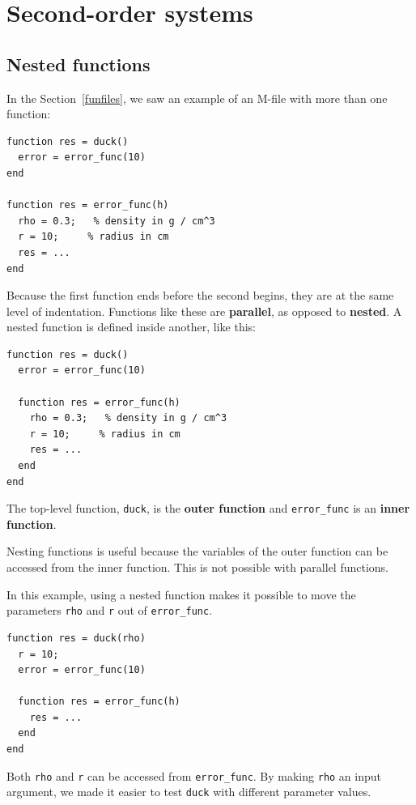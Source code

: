 \documentclass{book}
\begin{document}
\chapter{Second-order systems}


\section{Nested functions}

In the Section~\ref{funfiles}, we saw an example of an M-file with
more than one function:

\begin{verbatim}
function res = duck()
  error = error_func(10)
end

function res = error_func(h)
  rho = 0.3;   % density in g / cm^3
  r = 10;     % radius in cm
  res = ...
end
\end{verbatim}

Because the first function ends before the second begins, they are at
the same level of indentation. Functions like these are {\bf
parallel}, as opposed to {\bf nested}. A nested function is
defined inside another, like this:

\begin{verbatim}
function res = duck()
  error = error_func(10)

  function res = error_func(h)
    rho = 0.3;   % density in g / cm^3
    r = 10;     % radius in cm
    res = ...
  end
end
\end{verbatim}

The top-level function, {\tt duck}, is
the {\bf outer function} and {\tt error\_func} is
an {\bf inner function}.

Nesting functions is useful because the variables of the outer
function can be accessed from the inner function. This is not
possible with parallel functions.

In this example, using a nested function makes it possible to
move the parameters {\tt rho} and {\tt r} out of {\tt error\_func}.

\begin{verbatim}
function res = duck(rho)
  r = 10;
  error = error_func(10)

  function res = error_func(h)
    res = ...
  end
end
\end{verbatim}

Both {\tt rho} and {\tt r} can be accessed from {\tt error\_func}.
By making {\tt rho} an input argument, we made it easier to test
{\tt duck} with different parameter values.
\end{document}
